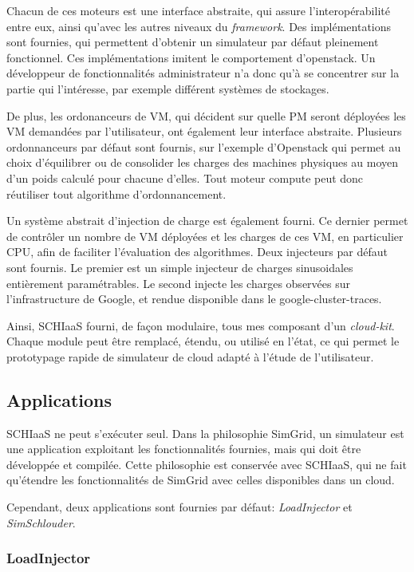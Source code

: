 \documentclass[parallelisme]{compas2017}
\begin{document}
Chacun de ces moteurs est une interface abstraite, qui assure l'interopérabilité entre eux, 
ainsi qu'avec les autres niveaux du \textit{framework}. Des implémentations sont fournies, qui 
permettent d'obtenir un simulateur par défaut pleinement fonctionnel. Ces implémentations 
imitent le comportement d'openstack. Un développeur de fonctionnalités administrateur n'a donc 
qu'à se concentrer sur la partie qui l'intéresse, par exemple différent systèmes de stockages.

De plus, les ordonanceurs de VM, qui décident sur quelle PM seront déployées les VM demandées
par l'utilisateur, ont également leur interface abstraite. Plusieurs ordonnanceurs par défaut
sont fournis, sur l'exemple d'Openstack qui permet au choix d'équilibrer ou de consolider les 
charges des machines physiques au moyen d'un poids calculé pour chacune d'elles. 
Tout moteur compute peut donc réutiliser tout algorithme d'ordonnancement.

Un système abstrait d'injection de charge est également fourni. Ce dernier permet de contrôler 
un nombre de VM déployées et les charges de ces VM, en particulier CPU, afin de faciliter 
l'évaluation des algorithmes. 
Deux injecteurs par défaut sont fournis. Le premier est un simple injecteur de charges sinusoidales
entièrement paramétrables. Le second injecte les charges observées sur l'infrastructure de Google,
et rendue disponible dans le google-cluster-traces.

Ainsi, SCHIaaS fourni, de façon modulaire, tous mes composant d'un \textit{cloud-kit}. 
Chaque module peut être remplacé, étendu, ou utilisé en l'état, ce qui permet le prototypage
rapide de simulateur de cloud adapté à l'étude de l'utilisateur.

\subsection{Applications}

SCHIaaS ne peut s'exécuter seul. Dans la philosophie SimGrid, un simulateur est une application
exploitant les fonctionnalités fournies, mais qui doit être développée et compilée.
Cette philosophie est conservée avec SCHIaaS, qui ne fait qu'étendre les fonctionnalités de 
SimGrid avec celles disponibles dans un cloud.

Cependant, deux applications sont fournies par défaut: \emph{LoadInjector} et \emph{SimSchlouder}.

\subsubsection{LoadInjector}
\end{document}
